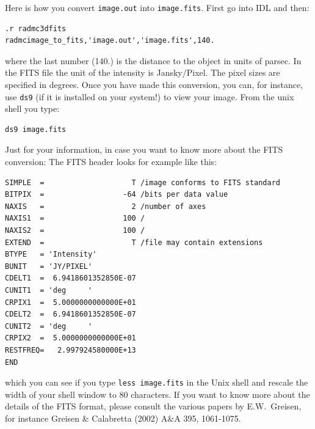 \documentclass{report}
\newenvironment{asciibox}%
  {\begin{list}{}{%
    \setlength{\topsep}{0.5em}%
    \setlength{\parskip}{0em}%
    \setlength{\parsep}{0em}%
    \setlength{\itemsep}{0em}%
    \setlength{\rightmargin}{0em}%
    \setlength{\leftmargin}{3.0em}%
    \setlength{\labelsep}{1em}%
    \setlength{\labelwidth}{2em}%
  }\normalfont\footnotesize\item}
  {\end{list}}
\begin{document}
Here is how you convert {\small\tt image.out} into {\small\tt image.fits}.
First go into IDL and then:
\begin{asciibox}\begin{verbatim}
.r radmc3dfits
radmcimage_to_fits,'image.out','image.fits',140.
\end{verbatim}\end{asciibox}
where the last number (140.) is the distance to the object in units of
parsec. In the FITS file the unit of the intensity is Jansky/Pixel. The
pixel sizes are specified in degrees. Once you have made this conversion,
you can, for instance, use {\small\tt ds9} (if it is installed on your
system!) to view your image. From the unix shell you type:
\begin{asciibox}\begin{verbatim}
ds9 image.fits
\end{verbatim}\end{asciibox}

Just for your information, in case you want to know more about 
the FITS conversion: The FITS header looks for example like this:
\begin{asciibox}\begin{verbatim}
SIMPLE  =                    T /image conforms to FITS standard                 
BITPIX  =                  -64 /bits per data value                             
NAXIS   =                    2 /number of axes                                  
NAXIS1  =                  100 /                                                
NAXIS2  =                  100 /                                                
EXTEND  =                    T /file may contain extensions                     
BTYPE   = 'Intensity'                                                           
BUNIT   = 'JY/PIXEL'                                                            
CDELT1  =  6.9418601352850E-07                                                  
CUNIT1  = 'deg     '                                                            
CRPIX1  =  5.0000000000000E+01                                                  
CDELT2  =  6.9418601352850E-07                                                  
CUNIT2  = 'deg     '                                                            
CRPIX2  =  5.0000000000000E+01                                                  
RESTFREQ=   2.997924580000E+13                                                  
END                                                                             
\end{verbatim}\end{asciibox}
which you can see if you type {\small\tt less image.fits} in the Unix shell and
rescale the width of your shell window to 80 characters. If you want to know
more about the details of the FITS format, please consult the various 
papers by E.W.~Greisen, for instance Greisen \& Calabretta (2002) A\&A
395, 1061-1075.
\end{document}

